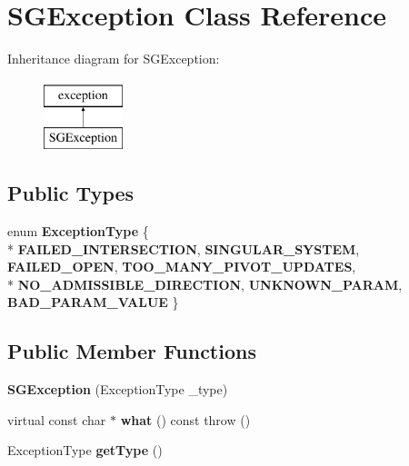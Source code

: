 \hypertarget{class_s_g_exception}{\section{S\+G\+Exception Class Reference}
\label{class_s_g_exception}
}
Inheritance diagram for S\+G\+Exception\+:\begin{figure}[H]
\begin{center}
\leavevmode
\includegraphics[height=2.000000cm]{class_s_g_exception}
\end{center}
\end{figure}
\subsection*{Public Types}
\begin{DoxyCompactItemize}
\item 
\hypertarget{class_s_g_exception_a7265666075c3771427267636a6853b1d}{enum {\bfseries Exception\+Type} \{ \\*
{\bfseries F\+A\+I\+L\+E\+D\+\_\+\+I\+N\+T\+E\+R\+S\+E\+C\+T\+I\+O\+N}, 
{\bfseries S\+I\+N\+G\+U\+L\+A\+R\+\_\+\+S\+Y\+S\+T\+E\+M}, 
{\bfseries F\+A\+I\+L\+E\+D\+\_\+\+O\+P\+E\+N}, 
{\bfseries T\+O\+O\+\_\+\+M\+A\+N\+Y\+\_\+\+P\+I\+V\+O\+T\+\_\+\+U\+P\+D\+A\+T\+E\+S}, 
\\*
{\bfseries N\+O\+\_\+\+A\+D\+M\+I\+S\+S\+I\+B\+L\+E\+\_\+\+D\+I\+R\+E\+C\+T\+I\+O\+N}, 
{\bfseries U\+N\+K\+N\+O\+W\+N\+\_\+\+P\+A\+R\+A\+M}, 
{\bfseries B\+A\+D\+\_\+\+P\+A\+R\+A\+M\+\_\+\+V\+A\+L\+U\+E}
 \}}\label{class_s_g_exception_a7265666075c3771427267636a6853b1d}

\end{DoxyCompactItemize}
\subsection*{Public Member Functions}
\begin{DoxyCompactItemize}
\item 
\hypertarget{class_s_g_exception_afa808a03425a061f24fee68b4d32aae4}{{\bfseries S\+G\+Exception} (Exception\+Type \+\_\+type)}\label{class_s_g_exception_afa808a03425a061f24fee68b4d32aae4}

\item 
\hypertarget{class_s_g_exception_ae95735eb15a25063aa713cd9d3c1ec7a}{virtual const char $\ast$ {\bfseries what} () const   throw ()}\label{class_s_g_exception_ae95735eb15a25063aa713cd9d3c1ec7a}

\item 
\hypertarget{class_s_g_exception_a6968ba5239e05b4f36f67cb8e69bed61}{Exception\+Type {\bfseries get\+Type} ()}\label{class_s_g_exception_a6968ba5239e05b4f36f67cb8e69bed61}

\end{DoxyCompactItemize}
